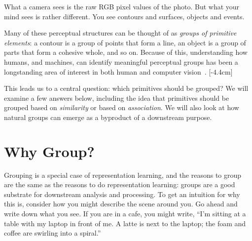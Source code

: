 What a camera sees is the raw RGB pixel values of the photo. But what your mind sees is rather different. You see contours and surfaces, objects and events.

Many of these perceptual structures can be thought of as \textit{groups of primitive elements}: a contour is a group of points that form a line, an object is a group of parts that form a cohesive whole, and so on. Because of this, understanding how humans, and machines, can identify meaningful perceptual groups has been a longstanding area of interest in both human and computer vision~\cite{Palmer1999}. %
[-4.4cm]

This leads us to a central question: which primitives should be grouped? We will examine a few answers below, including the idea that primitives should be grouped based on \textit{similarity} or based on \textit{association}. We will also look at how natural groups can emerge as a byproduct of a downstream purpose.

\section{Why Group?}
Grouping is a special case of representation learning, and the reasons to group are the same as the reasons to do representation learning: groups are a good substrate for downstream analysis and processing. To get an intuition for why this is, consider how you might describe the scene around you. Go ahead and write down what you see. If you are in a cafe, you might write, ``I'm sitting at a table with my laptop in front of me. A latte is next to the laptop; the foam and coffee are swirling into a spiral.''

